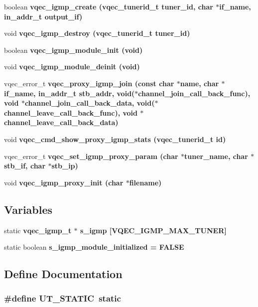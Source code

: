 \begin{CompactItemize}
boolean \bf{vqec\_\-igmp\_\-create} (vqec\_\-tunerid\_\-t tuner\_\-id, char $\ast$if\_\-name, in\_\-addr\_\-t output\_\-if)
\item 
void \bf{vqec\_\-igmp\_\-destroy} (vqec\_\-tunerid\_\-t tuner\_\-id)
\item 
boolean \bf{vqec\_\-igmp\_\-module\_\-init} (void)
\item 
void \bf{vqec\_\-igmp\_\-module\_\-deinit} (void)
\item 
vqec\_\-error\_\-t \bf{vqec\_\-proxy\_\-igmp\_\-join} (const char $\ast$name, char $\ast$if\_\-name, in\_\-addr\_\-t stb\_\-addr, void($\ast$channel\_\-join\_\-call\_\-back\_\-func), void $\ast$channel\_\-join\_\-call\_\-back\_\-data, void($\ast$channel\_\-leave\_\-call\_\-back\_\-func), void $\ast$channel\_\-leave\_\-call\_\-back\_\-data)
\item 
void \bf{vqec\_\-cmd\_\-show\_\-proxy\_\-igmp\_\-stats} (vqec\_\-tunerid\_\-t id)
\item 
vqec\_\-error\_\-t \bf{vqec\_\-set\_\-igmp\_\-proxy\_\-param} (char $\ast$tuner\_\-name, char $\ast$stb\_\-if, char $\ast$stb\_\-ip)
\item 
void \bf{vqec\_\-igmp\_\-proxy\_\-init} (char $\ast$\bf{filename})
\end{CompactItemize}
\subsection*{Variables}
\begin{CompactItemize}
\item 
static \bf{vqec\_\-igmp\_\-t} $\ast$ \bf{s\_\-igmp} [VQEC\_\-IGMP\_\-MAX\_\-TUNER]
\item 
static boolean \bf{s\_\-igmp\_\-module\_\-initialized} = \bf{FALSE}
\end{CompactItemize}


\subsection{Define Documentation}
\subsubsection{\setlength{\rightskip}{0pt plus 5cm}\#define UT\_\-STATIC~static}\label{vqec__igmp_8c_840be0a802b42af3ce4430a7173caa40}


